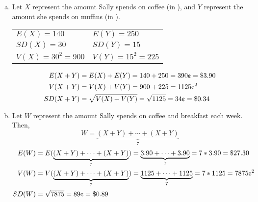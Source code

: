 %

{
\begin{enumerate}[(a)]
\item Let $X$ represent the amount Sally spends on coffee (in \textcent), and $Y$ represent the amount she spends on muffins (in \textcent). \\
\begin{center}
\begin{tabular}{l l}
$E(X) = 140$ & $E(Y) = 250$ \\
$SD(X) = 30$ & $SD(Y) = 15$ \\
$V(X) = 30^2 = 900$ & $V(Y) = 15^2 = 225$ \\
\end{tabular}
\end{center}
\begin{align*}
E(X + Y) &= E(X) + E(Y) = 140 + 250 = 390 \text{\textcent} = \$3.90 \\
V(X + Y) &= V(X) + V(Y) = 900 + 225 = 1125 \text{\textcent}^2 \\
SD(X + Y) &= \sqrt{V(X) + V(Y)} =  \sqrt{1125} = 34 \text{\textcent} = \$0.34
\end{align*}
\item Let $W$ represent the amount Sally spends on coffee and breakfast each week. Then,
\[ W = \underbrace{(X+Y) + \cdots + (X+Y)}_{7} \]
\begin{align*}
E(W) &= E(\underbrace{(X+Y) + \cdots + (X+Y)}_{7}) = \underbrace{3.90 + \cdots + 3.90}_{7} = 7 * 3.90 = \$27.30 \\
V(W) &= V(\underbrace{(X+Y) + \cdots + (X+Y)}_{7}) = \underbrace{1125 + \cdots + 1125}_{7} = 7 * 1125 =  7875 \text{\textcent}^2 \\
SD(W) &= \sqrt{7875} = 89 \text{\textcent} = \$0.89
\end{align*} 
\end{enumerate}
}


